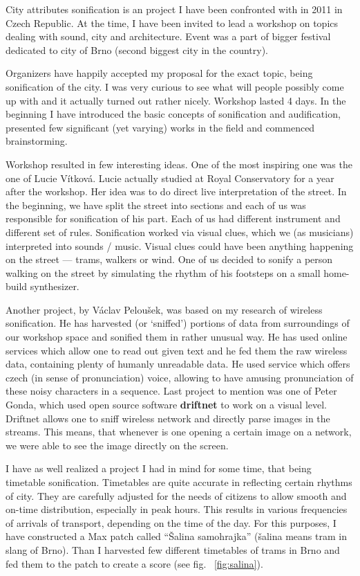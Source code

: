 \documentclass[12pt,a4paper,oneside]{report}
\begin{document}
City attributes sonification is an project I have been confronted with in 2011 in Czech Republic. At the time, I have been invited to lead a workshop on topics dealing with sound, city and architecture. Event was a part of bigger festival dedicated to city of Brno (second biggest city in the country).

Organizers have happily accepted my proposal for the exact topic, being sonification of the city. I was very curious to see what will people possibly come up with and it actually turned out rather nicely. Workshop lasted 4 days. In the beginning I have introduced the basic concepts of sonification and audification, presented few significant (yet varying) works in the field and commenced brainstorming.

Workshop resulted in few interesting ideas. One of the most inspiring one was the one of Lucie Vítková. Lucie actually studied at Royal Conservatory for a year after the workshop. Her idea was to do direct live interpretation of the street.  In the beginning, we have split the street into sections and each of us was responsible for sonification of his part. Each of us had different instrument and different set of rules. Sonification worked via visual clues, which we (as musicians) interpreted into sounds / music. Visual clues could have been anything happening on the street --- trams, walkers or wind. One of us decided to sonify a person walking on the street by simulating the rhythm of his footsteps on a small home-build synthesizer.

Another project, by Václav Peloušek, was based on my research of wireless sonification. He has harvested (or `sniffed') portions of data from surroundings of our workshop space and sonified them in rather unusual way. He has used online services which allow one to read out given text and he fed them the raw wireless data, containing plenty of humanly unreadable data. He used service which offers czech (in sense of pronunciation) voice, allowing to have amusing pronunciation of these noisy characters in a sequence. Last project to mention was one of Peter Gonda, which used open source software \textbf{driftnet} to work on a visual level. Driftnet allows one to sniff wireless network and directly parse images in the streams. This means, that whenever is one opening a certain image on a network, we were able to see the image directly on the screen.

I have as well realized a project I had in mind for some time, that being timetable sonification. Timetables are quite accurate in reflecting certain rhythms of city. They are carefully adjusted for the needs of citizens to allow smooth and on-time distribution, especially in peak hours. This results in various frequencies of arrivals of transport, depending on the time of the day. For this purposes, I have constructed a Max patch called ``Šalina samohrajka'' (šalina means tram in slang of Brno). Than I harvested few different timetables of trams in Brno and fed them to the patch to create a score (see fig. ~\ref{fig:salina}).
\end{document}
